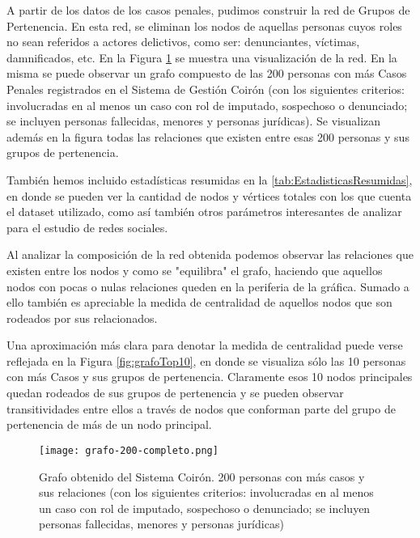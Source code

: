 A partir de los datos de los casos penales, pudimos
construir la red de Grupos de Pertenencia. En esta red, se eliminan los nodos de aquellas personas cuyos roles no sean referidos a actores delictivos, como ser: denunciantes, víctimas, damnificados, etc. En la Figura \ref{fig:grafocompleto} se muestra una visualización de la red. En la misma se puede observar un grafo compuesto de las 200 personas con más Casos Penales registrados en el Sistema de Gestión Coirón (con los siguientes criterios: involucradas en al menos un caso con rol de imputado, sospechoso o denunciado; se incluyen personas fallecidas, menores y personas jurídicas). Se visualizan además en la figura todas las relaciones que existen entre esas 200 personas y sus grupos de pertenencia.

También hemos incluido estadísticas resumidas en la \ref{tab:EstadisticasResumidas}, en donde se pueden ver la cantidad de nodos y vértices totales con los que cuenta el dataset utilizado, como así también otros parámetros interesantes de analizar para el estudio de redes sociales.

Al analizar la composición de la red obtenida podemos observar las relaciones que existen entre los nodos y como se "equilibra" el grafo, haciendo que aquellos nodos con pocas o nulas relaciones queden en la periferia de la gráfica. Sumado a ello también es apreciable la medida de centralidad de aquellos nodos que son rodeados por sus relacionados.

Una aproximación más clara para denotar la medida de centralidad puede verse reflejada en la Figura \ref{fig:grafoTop10}, en donde se visualiza sólo las 10 personas con más Casos y sus grupos de pertenencia. Claramente esos 10 nodos principales quedan rodeados de sus grupos de pertenencia y se pueden observar transitividades entre ellos a través de nodos que conforman parte del grupo de pertenencia de más de un nodo principal.



\begin{figure}
	\centering
	\texttt{[image: grafo-200-completo.png]}
	\caption{Grafo obtenido del Sistema Coirón. 200 personas con más casos y sus relaciones (con los siguientes criterios: involucradas en al menos un caso con rol de imputado, sospechoso o denunciado; se incluyen personas fallecidas, menores y personas jurídicas)} 
	\label{fig:grafocompleto}
\end{figure}

